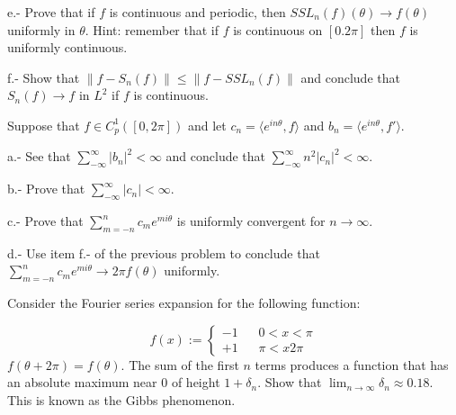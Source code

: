 e.- Prove that if $f$ is continuous and periodic, then 
$SSL_n(f)(\theta) \to f(\theta)$ uniformly in $\theta$.
Hint: remember that if $f$ is continuous on $[0.2\pi]$ then $f$ is 
uniformly continuous.

f.- Show that $\| f-S_n(f)\| \leq \|f - SSL_n(f)\|$ and conclude that 
$S_n(f) \to f$ in $L^2$ if $f$ is continuous.

\epro

\bpro
Suppose that $f \in C_p^1([0,2\pi])$ and let $c_n = \langle e^{in\theta},f \rangle$ and
$b_n = \langle e^{in\theta},f' \rangle$.

a.- See that $\sum_{-\infty}^{\infty} |b_n|^2 < \infty$ and conclude that 
    $\sum_{-\infty}^{\infty} n^2 |c_n|^2 < \infty$.

b.- Prove that $\sum_{-\infty}^{\infty} |c_n| < \infty$.

c.- Prove that $\sum_{m=-n}^{n} c_m e^{mi\theta}$ is uniformly convergent
for $n \to \infty$.

d.- Use item f.- of the previous problem to conclude that \hfill \\
     $\sum_{m=-n}^{n} c_m e^{mi\theta} \to 2\pi f(\theta)$
    uniformly.
\epro

\bpro
Consider the Fourier series expansion for the following function:


\begin{equation}
  f(x) := \left\{ \begin{array}{cc}
                      -1 & \;\;\; 0 < x < \pi \\
                      +1 & \;\;\; \pi < x 2\pi
                    \end{array}
                    \right.
\end{equation}
%
$f(\theta + 2\pi) = f(\theta)$.
The sum of the first $n$ terms produces a function that has an
absolute maximum near $0$ of height $1+ \delta_n$.
Show that $\lim_{n \to \infty} \delta_n \approx 0.18$. This is known as
the Gibbs phenomenon.
\epro





